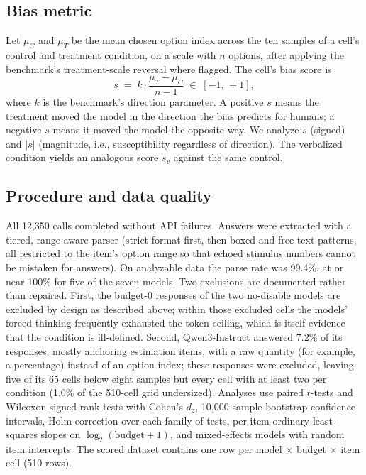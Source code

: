 \documentclass[conference]{IEEEtran}
\begin{document}
\subsection{Bias metric}
Let $\mu_C$ and $\mu_T$ be the mean chosen option index across the ten samples of a cell's control and treatment condition, on a scale with $n$ options, after applying the benchmark's treatment-scale reversal where flagged. The cell's bias score is
\begin{equation}
s \;=\; k \cdot \frac{\mu_T - \mu_C}{\,n - 1\,} \;\in\; [-1,\, +1],
\label{eq:score}
\end{equation}
where $k$ is the benchmark's direction parameter. A positive $s$ means the treatment moved the model in the direction the bias predicts for humans; a negative $s$ means it moved the model the opposite way. We analyze $s$ (signed) and $|s|$ (magnitude, i.e., susceptibility regardless of direction). The verbalized condition yields an analogous score $s_v$ against the same control.

\subsection{Procedure and data quality}
All 12,350 calls completed without API failures. Answers were extracted with a tiered, range-aware parser (strict format first, then boxed and free-text patterns, all restricted to the item's option range so that echoed stimulus numbers cannot be mistaken for answers). On analyzable data the parse rate was 99.4\%, at or near 100\% for five of the seven models. Two exclusions are documented rather than repaired. First, the budget-0 responses of the two no-disable models are excluded by design as described above; within those excluded cells the models' forced thinking frequently exhausted the token ceiling, which is itself evidence that the condition is ill-defined. Second, Qwen3-Instruct answered 7.2\% of its responses, mostly anchoring estimation items, with a raw quantity (for example, a percentage) instead of an option index; these responses were excluded, leaving five of its 65 cells below eight samples but every cell with at least two per condition (1.0\% of the 510-cell grid undersized). Analyses use paired $t$-tests and Wilcoxon signed-rank tests with Cohen's $d_z$, 10,000-sample bootstrap confidence intervals, Holm correction over each family of tests, per-item ordinary-least-squares slopes on $\log_2(\text{budget}+1)$, and mixed-effects models with random item intercepts. The scored dataset contains one row per model $\times$ budget $\times$ item cell (510 rows).
\end{document}
